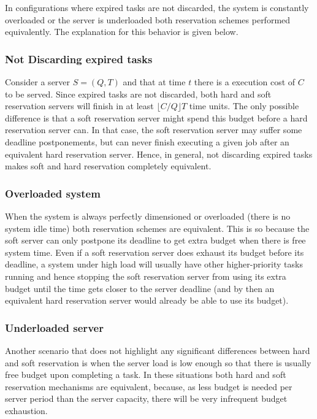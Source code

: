 \documentclass[times, 10pt,twocolumn]{article}
\begin{document}
\label{sec:noDifference}

In configurations where expired tasks are not discarded, the system is
constantly overloaded or the server is underloaded both reservation
schemes performed equivalently. The explanation for this behavior is
given below.

\subsubsection{Not Discarding expired tasks}
\label{sec:disc-expir-tasks}

Consider a server $S = (Q,T)$ and that at time $t$ there is a
execution cost of $C$ to be served.  Since expired tasks are not
discarded, both hard and soft reservation servers will finish in at
least $\lfloor C/Q \rfloor T$ time units.  The only possible
difference is that a soft reservation server might spend this budget
before a hard reservation server can. In that case, the soft
reservation server may suffer some deadline postponements, but can
never finish executing a given job after an equivalent hard
reservation server. Hence, in general, not discarding expired tasks
makes soft and hard reservation completely equivalent.

\subsubsection{Overloaded system}
\label{sec:system-load}

When the system is always perfectly dimensioned or overloaded (there
is no system idle time) both reservation schemes are equivalent. This
is so because the soft server can only postpone its deadline to get
extra budget when there is free system time. Even if a soft
reservation server does exhaust its budget before its deadline, a
system under high load will usually have other higher-priority tasks
running and hence stopping the soft reservation server from using its
extra budget until the time gets closer to the server deadline (and by
then an equivalent hard reservation server would already be able to
use its budget).

\subsubsection{Underloaded server}
\label{sec:server-load}

Another scenario that does not highlight any significant differences
between hard and soft reservation is when the server load is low
enough so that there is usually free budget upon completing a task. In
these situations both hard and soft reservation mechanisms are
equivalent, because, as less budget is needed per server period than
the server capacity, there will be very infrequent budget
exhaustion.
\end{document}
